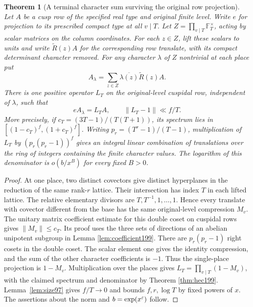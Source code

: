 \documentclass[a4paper,11pt]{article}
\newtheorem{theorem}[proposition]{Theorem}
\theoremstyle{definition}
\theoremstyle{remark}
\numberwithin{equation}{section}
\begin{document}
\begin{theorem}[A terminal character sum surviving the original row projection]
\label{thm:original200}
Let \(A\) be a cusp row of the specified real type and original
finite level. Write \(e\) for projection to its prescribed
compact type at all \(v\mid T\). Let
\(Z=\prod_{v\mid T}\mathbb F_T^\times\), acting by scalar
matrices on the column coordinates. For each \(z\in Z\), lift
these scalars to units and write \(\widetilde R(z)A\) for the
corresponding row translate, with its compact determinant
character removed. For any character \(\lambda\) of \(Z\)
nontrivial at each place put
\[
      A_\lambda=\sum_{z\in Z}\overline{\lambda(z)}
                                \widetilde R(z)A .
\]
There is one positive operator \(L_T\) on the original-level
cuspidal row, independent of \(\lambda\), such that
\begin{equation}
        e A_\lambda=L_TA,\qquad
        \|L_T-1\|\ll f/T .                         \label{eq:lift200}
\end{equation}
More precisely, if \(c_T=(3T-1)/(T(T+1))\), its spectrum
lies in \([(1-c_T)^f,(1+c_T)^f]\).
Writing \(p_r=(T^r-1)/(T-1)\), multiplication of \(L_T\)
by \((p_r(p_r-1))^f\) gives an integral linear combination
of translations over the ring of integers containing the
finite character values. The logarithm of this denominator
is \(o(b/x^B)\) for every fixed \(B>0\).
\end{theorem}
\begin{proof}
At one place, two distinct covectors give distinct hyperplanes
in the reduction of the same rank-\(r\) lattice. Their
intersection has index \(T\) in each lifted lattice. The
relative elementary divisors are \(T,T^{-1},1,\ldots,1\).
Hence every translate with covector different from the base
has the same original-level compression \(M_v\).
The unitary matrix coefficient estimate for this double coset
on cuspidal rows gives \(\|M_v\|\le c_T\). Its proof uses the
three sets of directions of an abelian unipotent subgroup in
Lemma \ref{lem:coefficient199}.
There are \(p_r(p_r-1)\) right cosets in the double coset.
The scalar element one gives the identity compression, and the
sum of the other character coefficients is \(-1\). Thus the
single-place projection is \(1-M_v\). Multiplication over the
places gives \(L_T=\prod_{v\mid T}(1-M_v)\), with the
claimed spectrum and denominator by
Theorem \ref{thm:hec199}.
Lemma~\ref{lem:size97} gives \(f/T\to0\) and bounds \(f,r,\log T\)
by fixed powers of \(x\). The assertions about the norm
and \(b=\exp(x^\varepsilon)\) follow.
\end{proof}
\end{document}
